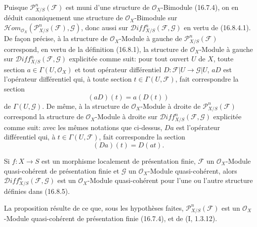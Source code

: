 \begin{env}[16.8.5]
\label{IV.16.8.5}
Puisque $\mathscr{P}_{X/S}^n(\mathscr{F})$ est muni d'une structure de
$\mathcal{O}_X$-Bimodule (16.7.4), on en déduit canoniquement une structure de
$\mathcal{O}_X$-Bimodule sur
$\mathscr{H}\!om_{\mathcal{O}_X}
(\mathscr{P}_{X/S}^n(\mathscr{F}),\mathscr{G})$, donc aussi sur
$\mathscr{D}\!iff_{X/S}^n(\mathscr{F},\mathscr{G})$ en vertu de (16.8.4.1).
De façon précise, à la structure de $\mathcal{O}_X$-Module à gauche de
$\mathscr{P}_{X/S}^n(\mathscr{F})$ correspond, en vertu de la définition
(16.8.1), la structure de $\mathcal{O}_X$-Module à gauche sur
$\mathscr{D}\!iff_{X/S}^n(\mathscr{F},\mathscr{G})$ explicitée comme suit:
pour tout ouvert $U$ de $X$, toute section
$a\in\Gamma(U,\mathcal{O}_X)$ et tout opérateur différentiel
$D:\mathscr{F}|U\to\mathscr{G}|U$, $aD$ est l'opérateur différentiel qui, à
toute section $t\in\Gamma(U,\mathscr{F})$, fait correspondre la section
\[
  (aD)(t)=a(D(t))
  \tag{16.8.5.1}
  \label{IV.16.8.5.1}
\]
de $\Gamma(U,\mathscr{G})$. De même, à la structure de
$\mathcal{O}_X$-Module à droite de $\mathscr{P}_{X/S}^n(\mathscr{F})$
correspond la structure de $\mathcal{O}_X$-Module à droite sur
$\mathscr{D}\!iff_{X/S}^n(\mathscr{F},\mathscr{G})$ explicitée comme suit:
avec les mêmes notations que ci-dessus, $Da$ est l'opérateur différentiel qui,
à $t\in\Gamma(U,\mathscr{F})$, fait correspondre la section
\[
  (Da)(t)=D(at).
  \tag{16.8.5.2}
  \label{IV.16.8.5.2}
\]
\end{env}

\begin{proposition}[16.8.6]
\label{IV.16.8.6}
Si $f:X\to S$ est un morphisme localement de présentation finie,
$\mathscr{F}$ un $\mathcal{O}_X$-Module quasi-cohérent de présentation finie
et $\mathscr{G}$ un $\mathcal{O}_X$-Module quasi-cohérent, alors
$\mathscr{D}\!iff_{X/S}^n(\mathscr{F},\mathscr{G})$ est un
$\mathcal{O}_X$-Module quasi-cohérent pour l'une ou l'autre structure définies
dans (16.8.5).
\end{proposition}

La proposition résulte de ce que, sous les hypothèses faites,
$\mathscr{P}_{X/S}^n(\mathscr{F})$ est un $\mathcal{O}_X$-Module
quasi-cohérent de présentation finie (16.7.4), et de (I, 1.3.12).

